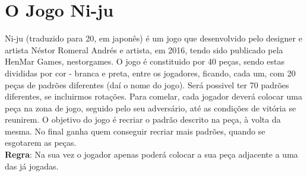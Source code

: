 \documentclass[a4paper]{article}
\begin{document}

\newpage

%
%
%
%
%
%
%


\section{O Jogo Ni-ju}

Ni-ju (traduzido para 20, em japonês) é um jogo que desenvolvido pelo designer e artista Néstor Romeral Andrés e artista, em 2016, tendo sido publicado pela HenMar Games, nestorgames.
O jogo é constituido por 40 peças, sendo estas divididas por cor - branca e preta, entre os jogadores, ficando, cada um, com 20 peças de padrões diferentes (daí o nome do jogo). Será possivel ter 70 padrões diferentes, se incluirmos rotações.
Para comelar, cada jogador deverá colocar uma peça na zona de jogo, seguido pelo seu adversário, até as condições de vitória se reunirem.
O objetivo do jogo é recriar o padrão descrito na peça, à volta da mesma. No final ganha quem conseguir recriar mais padrões, quando se esgotarem as peças.
\linebreak\linebreak\\
\textbf{Regra}:
  Na sua vez o jogador apenas poderá colocar a sua peça adjacente a uma das já jogadas.
\linebreak\linebreak\\
\end{document}
